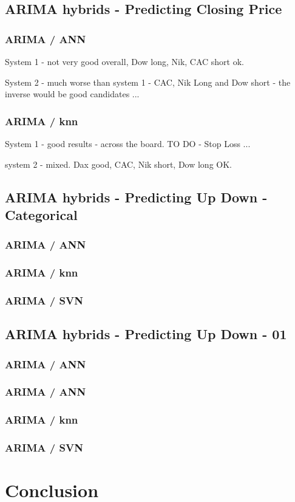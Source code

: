 \subsection{ARIMA hybrids - Predicting Closing Price}

\subsubsection{ARIMA / ANN}

System 1 - not very good overall, Dow long, Nik, CAC short ok.

System 2 - much worse than system 1 - CAC, Nik Long and Dow short - the inverse would be good candidates ...

\subsubsection{ARIMA / knn}

System 1 - good results - across the board.  TO DO - Stop Loss ...

system 2 - mixed.  Dax good, CAC, Nik short, Dow long OK.

\subsection{ARIMA hybrids - Predicting Up Down - Categorical}

\subsubsection{ARIMA / ANN}

\subsubsection{ARIMA / knn}

\subsubsection{ARIMA / SVN}

\subsection{ARIMA hybrids - Predicting Up Down - 01}

\subsubsection{ARIMA / ANN}

\subsubsection{ARIMA / ANN}

\subsubsection{ARIMA / knn}

\subsubsection{ARIMA / SVN}

\section{Conclusion}



